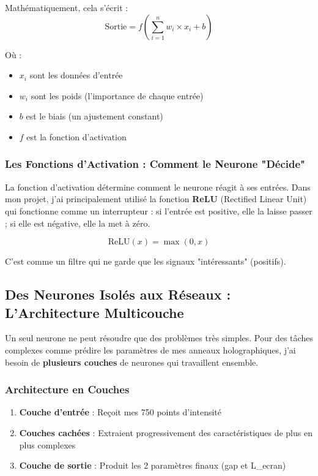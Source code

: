 \documentclass[11pt,a4paper]{article}
\begin{document}
Mathématiquement, cela s'écrit :
\begin{equation}
\text{Sortie} = f\left(\sum_{i=1}^{n} w_i \times x_i + b\right)
\end{equation}

Où :
\begin{itemize}
    \item $x_i$ sont les données d'entrée
    \item $w_i$ sont les poids (l'importance de chaque entrée)
    \item $b$ est le biais (un ajustement constant)
    \item $f$ est la fonction d'activation
\end{itemize}

\subsubsection{Les Fonctions d'Activation : Comment le Neurone "Décide"}

\begin{conceptbox}
La fonction d'activation détermine comment le neurone réagit à ses entrées. Dans mon projet, j'ai principalement utilisé la fonction \textbf{ReLU} (Rectified Linear Unit) qui fonctionne comme un interrupteur : si l'entrée est positive, elle la laisse passer ; si elle est négative, elle la met à zéro.

$$\text{ReLU}(x) = \max(0, x)$$

C'est comme un filtre qui ne garde que les signaux "intéressants" (positifs).
\end{conceptbox}

\subsection{Des Neurones Isolés aux Réseaux : L'Architecture Multicouche}

Un seul neurone ne peut résoudre que des problèmes très simples. Pour des tâches complexes comme prédire les paramètres de mes anneaux holographiques, j'ai besoin de \textbf{plusieurs couches} de neurones qui travaillent ensemble.

\subsubsection{Architecture en Couches}

\begin{enumerate}
    \item \textbf{Couche d'entrée} : Reçoit mes 750 points d'intensité
    \item \textbf{Couches cachées} : Extraient progressivement des caractéristiques de plus en plus complexes
    \item \textbf{Couche de sortie} : Produit les 2 paramètres finaux (gap et L\_ecran)
\end{enumerate}
\end{document}
